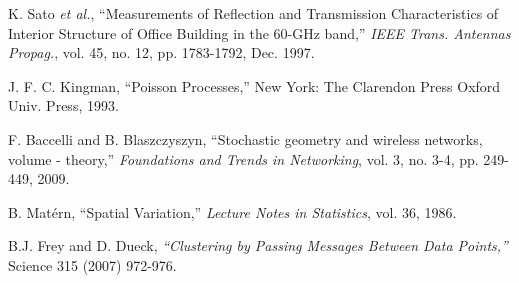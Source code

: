 \documentclass[10pt, conference, letterpaper]{IEEEtran}
\newcommand*{\Rom}[1]{\uppercase\expandafter{\romannumeral #1\relax}} %
\begin{document}
\begin{thebibliography}{50}

K. Sato \emph{et al.}, ``Measurements of Reflection and Transmission Characteristics of Interior Structure of Office Building in the 60-GHz band,'' \emph{IEEE Trans. Antennas Propag.}, vol. 45, no. 12, pp. 1783-1792, Dec. 1997.

J. F. C. Kingman, ``Poisson Processes,'' New York: The Clarendon Press Oxford Univ. Press, 1993.

F. Baccelli and B. Blaszczyszyn, ``Stochastic geometry and wireless networks, volume \Rom{1} - theory,'' \emph{Foundations and Trends in Networking}, vol. 3, no. 3-4, pp. 249-449, 2009.






B. Mat\'ern, ``Spatial Variation,'' \emph{Lecture Notes in Statistics}, vol. 36, 1986.


B.J. Frey and D. Dueck, \emph{``Clustering by Passing Messages Between Data Points,''} Science 315 (2007) 972-976.





\end{thebibliography}
\end{document}
